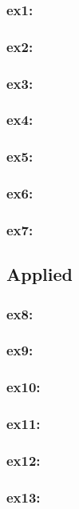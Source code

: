 \documentclass[a4paper,12pt,titlepage]{article} %
\begin{document}
\subsubsection{ex1:}
\subsubsection{ex2:}
\subsubsection{ex3:}
\subsubsection{ex4:}
\subsubsection{ex5:}
\subsubsection{ex6:}
\subsubsection{ex7:}

\subsection{Applied}
\subsubsection{ex8:}
\subsubsection{ex9:}
\subsubsection{ex10:}
\subsubsection{ex11:}
\subsubsection{ex12:}
\subsubsection{ex13:}
\end{document}
